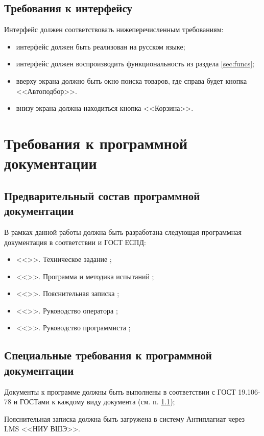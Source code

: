 \documentclass[a4paper,12pt]{article}
\begin{document}
  \subsection{Требования к интерфейсу}
  Интерфейс должен соответствовать нижеперечисленным требованиям:
  \begin{itemize}
    \item интерфейс должен быть реализован на русском языке;
    \item интерфейс должен воспроизводить функциональность из раздела \ref{sec:funcs};
    \item вверху экрана должно быть окно поиска товаров, где справа будет кнопка <<Автоподбор>>.
    \item внизу экрана должна находиться кнопка <<Корзина>>.
  \end{itemize}

  \newpage
  \section{Требования к программной документации}
  \subsection{Предварительный состав программной документации}
  \label{sec:doclist}
  В рамках данной работы должна быть разработана следующая программная документация в соответствии и ГОСТ ЕСПД:
  \begin{itemize}
    \item <<\CRTname>>. Техническое задание \cite{gostTZ};
    \item <<\CRTname>>. Программа и методика испытаний \cite{gostPMI};
    \item <<\CRTname>>. Пояснительная записка \cite{gostPZ};
    \item <<\CRTname>>. Руководство оператора \cite{gostRO};
    \item <<\CRTname>>. Руководство программиста \cite{gostRP};
  \end{itemize}

  \subsection{Специальные требования к программной документации}
  Документы к программе должны быть выполнены в соответствии с ГОСТ 19.106-78 и ГОСТами к каждому виду документа
  (см. п. \ref{sec:doclist});

  Пояснительная записка должна быть загружена в систему Антиплагиат через LMS <<НИУ ВШЭ>>.
\end{document}
